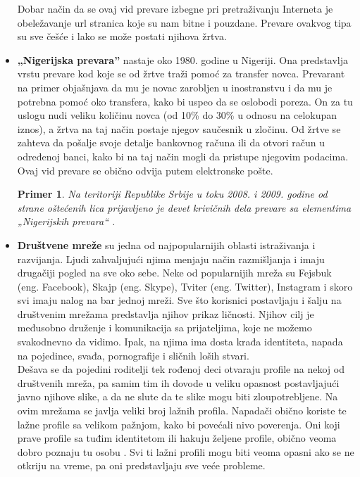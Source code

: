 \documentclass[a4paper]{article}
\newtheorem{primer}{Primer}[section]
\begin{document}
\begin{itemize}
Dobar način da se ovaj vid prevare izbegne pri pretraživanju Interneta je obeležavanje url stranica koje su nam bitne i pouzdane. Prevare ovakvog tipa su sve češće i lako se može postati njihova žrtva.
\item \textbf{„Nigerijska prevara”} nastaje oko 1980. godine u Nigeriji. Ona predstavlja vrstu prevare kod koje se od žrtve traži pomoć za transfer novca. Prevarant na primer objašnjava da mu je novac zarobljen u inostranstvu i da mu je potrebna pomoć oko transfera, kako bi uspeo da se oslobodi poreza. On za tu uslogu nudi veliku količinu novca (od 10\% do 30\% u odnosu na celokupan iznos), a žrtva na taj način postaje njegov saučesnik u zločinu. Od žrtve se zahteva da pošalje svoje detalje bankovnog računa ili da otvori račun u određenoj banci, kako bi na taj način mogli da pristupe njegovim podacima. Ovaj vid prevare se obično odvija putem elektronske pošte. 
\begin{primer}
Na teritoriji Republike Srbije u toku 2008. i 2009. godine od strane oštećenih lica prijavljeno je devet krivičnih dela prevare sa elementima „Nigerijskih prevara“ \cite{nig}.
\end{primer}
\item\textbf{Društvene mreže} su jedna od najpopularnijih oblasti istraživanja i razvijanja. Ljudi zahvaljujući njima menjaju način razmišljanja i imaju drugačiji pogled na sve oko sebe. Neke od popularnijih mreža su Fejsbuk (eng. Facebook), Skajp (eng. Skype), Tviter (eng. Twitter), Instagram i skoro svi imaju nalog na bar jednoj mreži. Sve što korisnici postavljaju i šalju na društvenim mrežama predstavlja njihov prikaz ličnosti. Njihov cilj je međusobno druženje i komunikacija sa prijateljima, koje ne možemo svakodnevno da vidimo. Ipak, na njima ima dosta krađa identiteta, napada na pojedince, svađa, pornografije i sličnih loših stvari.\\Dešava se da pojedini roditelji tek rođenoj deci otvaraju profile na nekoj od društvenih mreža, pa samim tim ih dovode u veliku opasnost postavljajući javno njihove slike, a da ne slute da te slike mogu biti zloupotrebljene. Na ovim mrežama se javlja veliki broj lažnih profila.
Napadači obično koriste te lažne profile sa velikom pažnjom, kako bi povećali nivo poverenja. Oni koji prave profile sa tuđim identitetom ili hakuju željene profile, obično veoma dobro poznaju tu osobu \cite{fakePr}. Svi ti lažni profili mogu biti veoma opasni ako se ne otkriju na vreme, pa oni predstavljaju sve veće probleme.
\end{itemize}
\end{document}
